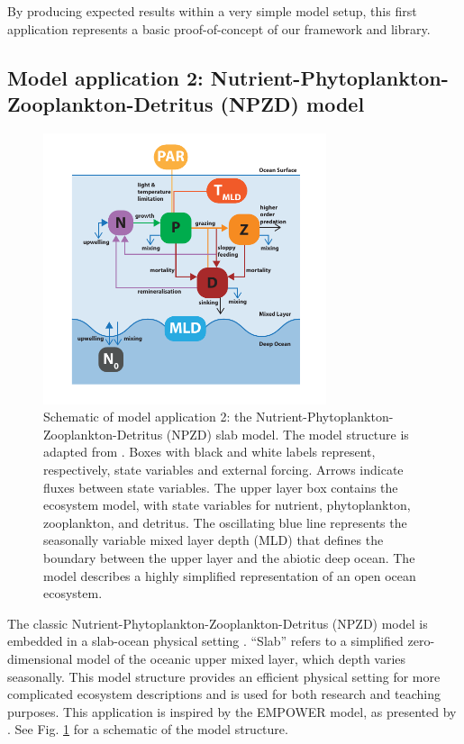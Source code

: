 \documentclass[journal abbreviation, manuscript]{copernicus}
\begin{document}
By producing expected results within a very simple model setup, this first application represents a basic proof-of-concept of our framework and library.




\subsection{Model application 2: Nutrient-Phytoplankton-Zooplankton-Detritus (NPZD) model}
\begin{figure}[t]
\includegraphics[width=8.3cm]{Figures/firstdraft_schematics/02_schematics_EMPOWER.pdf}
\caption{Schematic of model application 2: the Nutrient-Phytoplankton-Zooplankton-Detritus (NPZD) slab model. The model structure is adapted from \citet{Anderson2015c}. Boxes with black and white labels represent, respectively, state variables and external forcing. Arrows indicate fluxes between state variables. The upper layer box contains the ecosystem model, with state variables for nutrient, phytoplankton, zooplankton, and detritus. The oscillating blue line represents the seasonally variable mixed layer depth (MLD) that defines the boundary between the upper layer and the abiotic deep ocean. The model describes a highly simplified representation of an open ocean ecosystem.}
\label{Figure:ModelSchematics_2}
\end{figure}

The classic Nutrient-Phytoplankton-Zooplankton-Detritus (NPZD) model is embedded in a slab-ocean physical setting \citep[e.g.,][]{Evans1985ACycles, Fasham1990a}. “Slab” refers to a simplified zero-dimensional model of the oceanic upper mixed layer, which depth varies seasonally. This model structure provides an efficient physical setting for more complicated ecosystem descriptions and is used for both research and teaching purposes. This application is inspired by the EMPOWER model, as presented by \citet{Anderson2015c}. See Fig. \ref{Figure:ModelSchematics_2} for a schematic of the model structure.
\end{document}

